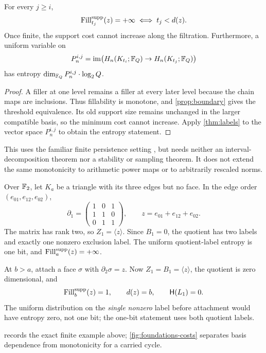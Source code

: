 \documentclass[11pt,a4paper]{article}
\begin{document}
\begin{proposition}
\label{prop:persistence}
For every $j\geq i$,
\[
 \operatorname{Fill}^{\mathrm{supp}}_{t_j}(z)=+\infty\iff t_j<d(z).
\]
Once finite, the support cost cannot increase along the filtration.
Furthermore, a uniform variable on
\[
 P_n^{i,j}=\operatorname{im}\bigl(H_n(K_{t_i};\mathbb F_Q)\to H_n(K_{t_j};\mathbb F_Q)\bigr)
\]
has entropy $\dim_{\mathbb F_Q}P_n^{i,j}\cdot\log_2Q$.
\end{proposition}

\begin{proof}
A filler at one level remains a filler at every later level because the
chain maps are inclusions.  Thus fillability is monotone, and
\cref{prop:boundary} gives the threshold equivalence.  Its old support
size remains unchanged in the larger compatible basis, so the minimum
cost cannot increase.  Apply \cref{thm:labels} to the vector space
$P_n^{i,j}$ to obtain the entropy statement.
\end{proof}

This uses the familiar finite persistence setting
\cite{zomorodian-carlsson}, but needs neither an interval-decomposition
theorem nor a stability or sampling theorem.  It does not extend the same
monotonicity to arithmetic power maps or to arbitrarily rescaled norms.

\begin{example}\label{ex:triangle}
Over $\mathbb F_2$, let $K_a$ be a triangle with its three edges but no face.
In the edge order $(e_{01},e_{12},e_{02})$,
\[
 \partial_1=
 \begin{pmatrix}1&0&1\\1&1&0\\0&1&1\end{pmatrix},
 \qquad z=e_{01}+e_{12}+e_{02}.
\]
The matrix has rank two, so $Z_1=\langle z\rangle$.  Since $B_1=0$,
the quotient has two labels and exactly one nonzero exclusion label.
The uniform quotient-label entropy is one bit, and
$\operatorname{Fill}^{\mathrm{supp}}_a(z)=+\infty$.

At $b>a$, attach a face $\sigma$ with $\partial_2\sigma=z$.
Now $Z_1=B_1=\langle z\rangle$, the quotient is zero dimensional, and
\[
 \operatorname{Fill}^{\mathrm{supp}}_b(z)=1,\qquad d(z)=b,
 \qquad\mathsf H(L_1)=0.
\]
The uniform distribution on the \emph{single nonzero} label before
attachment would have entropy zero, not one bit; the one-bit statement
uses both quotient labels.
\end{example}

 records the exact finite example above;
\cref{fig:foundations-costs} separates basis dependence from monotonicity
for a carried cycle.


\end{document}
